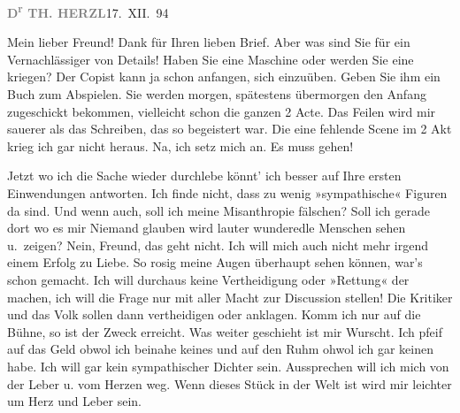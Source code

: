 \pstart
           \textcolor{gray}{\textbf{D\textsuperscript{r}{ }TH. HERZL}}\hfill 17. XII. 94\pend
           
\pstart{}Mein lieber Freund!\pend\vspace{0.5em}
\pstart
           Dank für Ihren lieben Brief. Aber was
      sind Sie für ein Vernachlässiger von
       Details! Haben Sie eine Maschine oder
      werden Sie eine kriegen? Der Copist
      kann ja schon anfangen, sich einzuüben.
      Geben Sie ihm ein Buch zum Abspielen.
      Sie werden morgen, spätestens übermorgen den Anfang zugeschickt bekommen,
               vielleicht schon die ganzen 2 Acte.
      Das Feilen wird mir sauerer als
      das Schreiben, das so begeistert war.
      Die eine fehlende Scene im 2 Akt
      krieg ich gar nicht heraus. Na, ich
      setz mich an. Es muss gehen!\pend
           
\pstart
           Jetzt wo ich die Sache wieder durchlebe könnt’ ich besser auf Ihre
      ersten Einwendungen antworten. Ich
      finde nicht, dass zu wenig »sympathische«
      Figuren da sind. Und wenn auch,
      soll ich meine Misanthropie fälschen? {\pb}Soll ich gerade dort wo es mir Niemand
      glauben wird lauter wunderedle Menschen
      sehen u. zeigen? Nein, Freund, das geht
      nicht. Ich will mich auch nicht mehr \label{K_L03839-1v}\label{K_L03839-1} irgend einem Erfolg zu Liebe.
      So rosig meine Augen überhaupt sehen
      können, war’s schon gemacht. Ich will
      durchaus keine Vertheidigung oder »Rettung«
      der \label{K_L03839-2v}\label{K_L03839-2} machen, ich will die Frage
      nur mit aller Macht zur Discussion
      stellen! Die Kritiker und das Volk
      sollen dann vertheidigen oder anklagen.
      Komm ich \introOben{}nur\introOben{} auf die Bühne, so ist der
      Zweck erreicht. Was weiter geschieht
      ist mir Wurscht. Ich pfeif auf das
      Geld obwol ich beinahe keines und
      auf den Ruhm ohwol ich gar keinen
      habe. Ich will gar kein sympathischer
      Dichter sein. Aussprechen will ich mich
      von der Leber u. vom Herzen weg.
      Wenn dieses Stück in der Welt ist
      wird mir leichter um Herz und
      Leber sein.\pend
           
